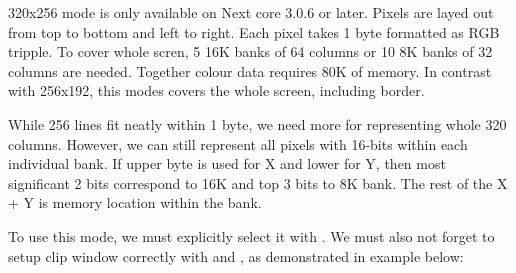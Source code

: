 \documentclass[12pt,twoside,openright,a4paper]{book}
\begin{document}
320x256 mode is only available on Next core 3.0.6 or later. Pixels are layed out from top to bottom and left to right. Each pixel takes 1 byte formatted as RGB tripple. To cover whole scren, 5 16K banks of 64 columns or 10 8K banks of 32 columns are needed. Together colour data requires 80K of memory. In contrast with 256x192, this modes covers the whole screen, including border.

While 256 lines fit neatly within 1 byte, we need more for representing whole 320 columns. However, we can still represent all pixels with 16-bits within each individual bank. If upper byte is used for X and lower for Y, then most significant 2 bits correspond to 16K and top 3 bits to 8K bank. The rest of the X + Y is memory location within the bank.

To use this mode, we must explicitly select it with . We must also not forget to setup clip window correctly with  and , as demonstrated in example below:
\end{document}
